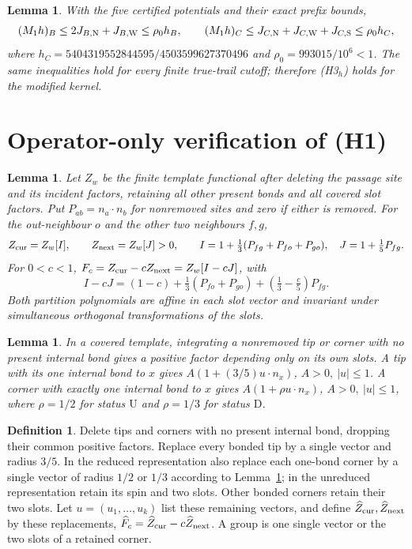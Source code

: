 \documentclass[11pt,reqno]{amsart}
\newtheorem{lemma}[theorem]{Lemma}
\theoremstyle{definition}
\newtheorem{definition}[theorem]{Definition}
\theoremstyle{remark}
\begin{document}
\begin{lemma}\label{l:stationary-assembly}
With the five certified potentials and their exact prefix bounds,
\[
 (M_1h)_B\le2J_{B,{\rm N}}+J_{B,{\rm W}}\le\rho_0h_B,\qquad
 (M_1h)_C\le J_{C,{\rm N}}+J_{C,{\rm W}}+J_{C,{\rm S}}
                                      \le\rho_0h_C ,
\]
where \(h_C=5404319552844595/4503599627370496\) and
\(\rho_0=993015/10^6<1\).
The same inequalities hold for every finite true-trail cutoff;
therefore (H3\(_h\)) holds for the modified kernel.
\end{lemma}


\section{Operator-only verification of (H1)}

\begin{lemma}\label{l:Iw}
Let \(Z_w\) be the finite template functional after deleting
the passage site and its incident factors, retaining all other
present bonds and all covered slot factors. Put \(P_{ab}=n_a\cdot n_b\)
for nonremoved sites and zero if either is removed.
For the out-neighbour \(o\) and the other two neighbours \(f,g\),
\[
 Z_{\rm cur}=Z_w[I],\qquad Z_{\rm next}=Z_w[J]>0,\qquad
 I=1+\tfrac13(P_{fg}+P_{fo}+P_{go}),\quad J=1+\tfrac15P_{fg}.
\]
For \(0<c<1\), \(F_c=Z_{\rm cur}-cZ_{\rm next}=Z_w[I-cJ]\), with
\[
 I-cJ=(1-c)+\tfrac13(P_{fo}+P_{go})+(\tfrac13-\tfrac c5)P_{fg}.
\]
Both partition polynomials are affine in each slot vector and
invariant under simultaneous orthogonal transformations of the slots.
\end{lemma}

\begin{lemma}\label{l:leaf}
In a covered template, integrating a nonremoved tip or corner
with no present internal bond gives a positive factor depending
only on its own slots.
A tip with its one internal bond to \(x\) gives
\(A(1+(3/5)u\cdot n_x)\), \(A>0,\ |u|\le1\).
A corner with exactly one internal bond to \(x\) gives
\(A(1+\rho u\cdot n_x)\), \(A>0,\ |u|\le1\), where
\(\rho=1/2\) for status \(\mathrm U\) and \(\rho=1/3\)
for status \(\mathrm D\).
\end{lemma}

\begin{definition}\label{d:reduction}
Delete tips and corners with no present internal bond, dropping
their common positive factors. Replace every bonded tip by a
single vector and radius \(3/5\).
In the reduced representation also replace each one-bond corner
by a single vector of radius \(1/2\) or \(1/3\) according to
Lemma~\ref{l:leaf}; in the unreduced representation retain its spin
and two slots. Other bonded corners retain their two slots.
Let \(u=(u_1,\ldots,u_k)\) list these remaining vectors, and define
\(\widehat Z_{\rm cur},\widehat Z_{\rm next}\) by these replacements,
\(\widehat F_c=\widehat Z_{\rm cur}-c\widehat Z_{\rm next}\).
A group is one single vector or the two slots of a retained corner.
\end{definition}
\end{document}
